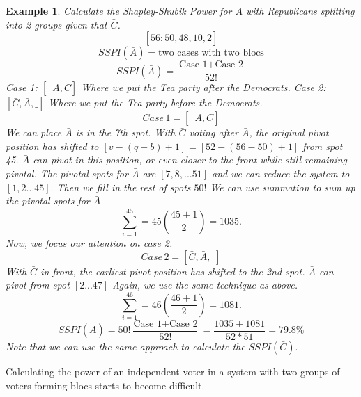 \documentclass[12pt]{article}
\newtheorem{example}[theorem]{Example}
\begin{document}
\begin{example}\label{SSP(CA6)}
Calculate the Shapley-Shubik Power for $\bar{A}$ with Republicans splitting into 2 groups given that $\bar{C}$.
$$[56:\bar{50}, 48,\bar{10},2]$$
\begin{equation}
SSPI(\bar{A}) = \text{two cases with two blocs}
\end{equation}
\begin{equation}
SSPI(\bar{A})=\frac{\text{Case 1}+\text{Case 2}}{52!}
\end{equation}
Case 1: $[\_ \, \bar{A},\bar{C}]$
Where we put the Tea party after the Democrats.
Case 2: $[\bar{C},\bar{A},\_]$
Where we put the Tea party before the Democrats. 
\begin{equation}
Case\,1=[\_ \, \bar{A},\bar{C}]
\end{equation}
We can place $\bar{A}$ is in the 7th spot. With $\bar{C}$ voting after $\bar{A}$, the original pivot position has shifted to $[v-(q-b)+1]=[52-(56-50)+1]$ from spot 45.  $\bar{A}$ can pivot in this position, or even closer to the front while still remaining pivotal. The pivotal spots for $\bar{A}$ are $[7,8,...51]$ and we can reduce the system to $[1,2...45].$ Then we fill in the rest of spots $50!$
We can use summation to sum up the pivotal spots for $\bar{A}$
$${\sum\limits_{i=1}^{45}=45(\frac{45+1}{2})} = 1035.$$
Now, we focus our attention on case 2.
\begin{equation}
Case\, 2=[\bar{C},\bar{A},\_]
\end{equation}
With $\bar{C}$ in front, the earliest pivot position has shifted to the 2nd spot. $\bar{A}$ can pivot from spot $[2...47]$ Again, we use the same technique as above. 
$${\sum\limits_{i=1}^{46}=46(\frac{46+1}{2})} = 1081.$$
\begin{equation}
SSPI(\bar{A})=50!\frac{\text{Case 1}+\text{Case 2}}{52!}=\frac{1035+1081}{52*51} = 79.8\%
\end{equation}
Note that we can use the same approach to calculate the $SSPI(\bar{C}).$
\end{example}
Calculating the power of an independent voter in a system with two groups of voters forming blocs starts to become difficult. 
\end{document}
